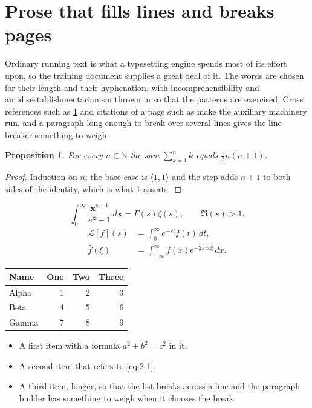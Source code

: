 \documentclass[11pt,a4paper]{report}
\theoremstyle{plain}
\newtheorem{proposition}{Proposition}[chapter]
\newcommand{\vecn}[1]{\mathbf{#1}}
\newcommand{\pairs}[2]{\langle #1,#2\rangle}
\begin{document}
\section{Prose that fills lines and breaks pages}
\label{sec:prose2-1}
Ordinary running text is what a typesetting engine spends most of its effort
upon, so the training document supplies a great deal of it. The words are
chosen for their length and their hyphenation, with incomprehensibility and
antidisestablishmentarianism thrown in so that the patterns are exercised.
Cross references such as \cref{sec:prose2-1} and citations of a page such
as \pageref{sec:prose2-1} make the auxiliary machinery run, and a
paragraph long enough to break over several lines gives the line breaker
something to weigh.
\begin{proposition}\label{prop:2-1}
For every $n\in\mathbb{N}$ the sum $\sum_{k=1}^{n}k$ equals
$\tfrac{1}{2}n(n+1)$.
\end{proposition}
\begin{proof}
Induction on $n$; the base case is $\pairs{1}{1}$ and the step adds $n+1$ to
both sides of the identity, which is what \cref{prop:2-1} asserts.
\end{proof}
\begin{equation}\label{eq:2-1}
  \int_{0}^{\infty}\frac{\vecn{x}^{s-1}}{e^{\vecn{x}}-1}\,d\vecn{x}
    = \Gamma(s)\zeta(s),\qquad \Re(s)>1 .
\end{equation}
\begin{align}
  \mathcal{L}[f](s) &= \int_{0}^{\infty} e^{-st} f(t)\,dt, \\
  \widehat{f}(\xi)  &= \int_{-\infty}^{\infty} f(x) e^{-2\pi i x\xi}\,dx .
\end{align}
\par\noindent\begin{center}
\begin{tabular}{lrrr}
\hline
Name & One & Two & Three \\
\hline
Alpha & 1 & 2 & 3 \\
Beta & 4 & 5 & 6 \\
Gamma & 7 & 8 & 9 \\
\hline
\end{tabular}
\end{center}
\begin{itemize}
  \item A first item with a formula $a^2+b^2=c^2$ in it.
  \item A second item that refers to \eqref{eq:2-1}.
  \item A third item, longer, so that the list breaks across a line and the
    paragraph builder has something to weigh when it chooses the break.
\end{itemize}
\end{document}

